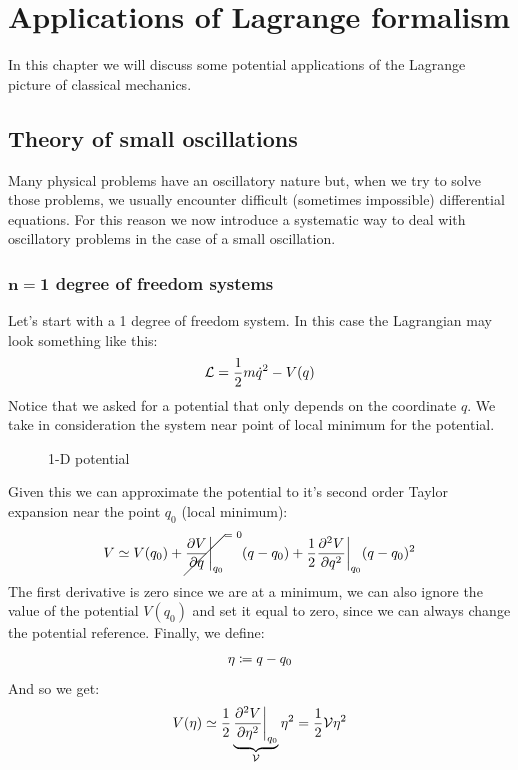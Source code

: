 \chapter{Applications of Lagrange formalism}
In this chapter we will discuss some potential applications of the Lagrange picture of classical mechanics.
\section{Theory of small oscillations}
Many physical problems have an oscillatory nature but, when we try to solve those problems, we usually encounter difficult (sometimes impossible) differential equations.
For this reason we now introduce a systematic way to deal with oscillatory problems in the case of a small oscillation.
\subsection{$\mathbf{n = 1}$ degree of freedom systems}
Let's start with a 1 degree of freedom system. In this case the Lagrangian may look something like this:
\begin{equation}
    \mathcal{L} = \dfrac{1}{2}m\dot{q}^2 - V(q)
\end{equation}
Notice that we asked for a potential that only depends on the coordinate $q$.
We take in consideration the system near point of local minimum for the potential.
\begin{figure}[!ht]
    \centering
    
    \caption{1-D potential}
    \label{fig:image10}
\end{figure}
Given this we can approximate the potential to it's second order Taylor expansion near the point $q_0$ (local minimum):
\begin{equation}
    V \simeq V(q_0) + \crossout{\partialD{V}{q}\bigg|_{q_0}}(q-q_0) + \dfrac{1}{2}\partialDD{V}{q}\bigg|_{q_0}(q-q_0)^2
\end{equation}
The first derivative is zero since we are at a minimum, we can also ignore the value of the potential $V(q_0)$ and set it equal to zero, since we can always change the potential reference. Finally, we define:
\begin{equation}
    \eta \coloneqq q-q_0
\end{equation}
And so we get:
\begin{equation} \label{e:potential_1D_oscillation}
    V(\eta) \simeq \dfrac{1}{2}\underbrace{\dfrac{\partial^2 V}{\partial \eta^2}\bigg|_{q_0}}_{\mathcal{V}}\eta^2 = \dfrac{1}{2}\mathcal{V}\eta^2
\end{equation}
